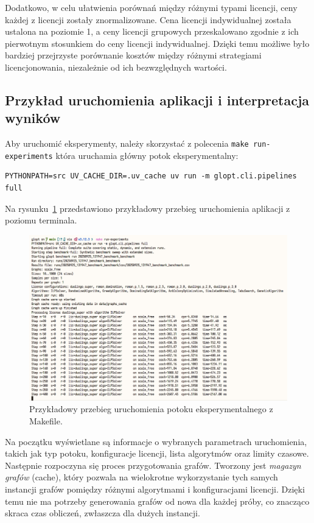 Dodatkowo, w celu ułatwienia porównań między różnymi typami licencji, ceny każdej z licencji zostały znormalizowane. Cena licencji indywidualnej została ustalona na poziomie 1, a ceny licencji grupowych przeskalowano zgodnie z ich pierwotnym stosunkiem do ceny licencji indywidualnej. Dzięki temu możliwe było bardziej przejrzyste porównanie kosztów między różnymi strategiami licencjonowania, niezależnie od ich bezwzględnych wartości.

\subsection{Przykład uruchomienia aplikacji i interpretacja wyników}

Aby uruchomić eksperymenty, należy skorzystać z polecenia \texttt{make run-experiments} która uruchamia główny potok eksperymentalny:
\begin{verbatim}
PYTHONPATH=src UV_CACHE_DIR=.uv_cache uv run -m glopt.cli.pipelines full
\end{verbatim}

Na rysunku~\ref{fig:cli-content} przedstawiono przykładowy przebieg uruchomienia aplikacji z poziomu terminala.

\begin{figure}[H]
  \centering
  \includegraphics[width=0.95\linewidth]{assets/cli-content.png}
  \caption{Przykładowy przebieg uruchomienia potoku eksperymentalnego z Makefile.}
  \label{fig:cli-content}
\end{figure}

Na początku wyświetlane są informacje o wybranych parametrach uruchomienia, takich jak typ potoku, konfiguracje licencji, lista algorytmów oraz limity czasowe. Następnie rozpoczyna się proces przygotowania grafów. Tworzony jest \textit{magazyn grafów} (cache), który pozwala na wielokrotne wykorzystanie tych samych instancji grafów pomiędzy różnymi algorytmami i konfiguracjami licencji. Dzięki temu nie ma potrzeby generowania grafów od nowa dla każdej próby, co znacząco skraca czas obliczeń, zwłaszcza dla dużych instancji.

